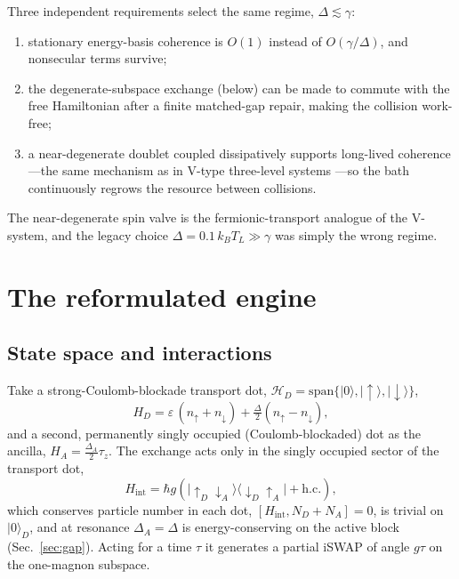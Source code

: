 \documentclass[11pt,a4paper]{article}
\newcommand{\up}{\uparrow}
\newcommand{\dn}{\downarrow}
\newcommand{\ket}[1]{|#1\rangle}
\newcommand{\bra}[1]{\langle #1|}
\begin{document}
Three independent requirements select the same regime, $\Delta\lesssim\gamma$:
\begin{enumerate}
\item stationary energy-basis coherence is $O(1)$ instead of $O(\gamma/\Delta)$, and nonsecular terms survive;
\item the degenerate-subspace exchange (below) can be made to commute with the free Hamiltonian after a finite matched-gap repair, making the collision work-free;
\item a near-degenerate doublet coupled dissipatively supports long-lived coherence---the same mechanism as in V-type three-level systems \cite{Vsystem}---so the bath continuously regrows the resource between collisions.
\end{enumerate}
The near-degenerate spin valve is the fermionic-transport analogue of the V-system, and the legacy choice $\Delta=0.1\,k_BT_L\gg\gamma$ was simply the wrong regime.

\section{The reformulated engine}\label{sec:model}

\subsection{State space and interactions}

Take a strong-Coulomb-blockade transport dot, $\mathcal H_D=\mathrm{span}\{\ket{0},\ket{\up},\ket{\dn}\}$,
\begin{equation}
H_D=\varepsilon\,(n_\up+n_\dn)+\tfrac{\Delta}{2}(n_\up-n_\dn),
\end{equation}
and a second, permanently singly occupied (Coulomb-blockaded) dot as the ancilla, $H_A=\tfrac{\Delta_A}{2}\tau_z$. The exchange acts only in the singly occupied sector of the transport dot,
\begin{equation}\label{eq:hint}
H_{\mathrm{int}}=\hbar g\left(\ket{\up_D\dn_A}\bra{\dn_D\up_A}+\mathrm{h.c.}\right),
\end{equation}
which conserves particle number in each dot, $[H_{\mathrm{int}},N_D+N_A]=0$, is trivial on $\ket{0}_D$, and at resonance $\Delta_A=\Delta$ is energy-conserving on the active block (Sec.~\ref{sec:gap}). Acting for a time $\tau$ it generates a partial iSWAP of angle $g\tau$ on the one-magnon subspace.
\end{document}
